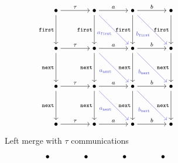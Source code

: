 \begin{figure}[!ht]
   \centering

   \begin{subfigure}[b]{0.475\textwidth}
      \[\begin{tikzcd}[cramped, column sep=scriptsize]
	 \bullet && \bullet && \bullet && \bullet \\
	 \\
	 \bullet && \bullet && \bullet && \bullet \\
	 \\
	 \bullet && \bullet && \bullet && \bullet \\
	 \\
	 \bullet && \bullet && \bullet && \bullet
	 \arrow["\tau", from=1-1, to=1-3]
	 \arrow["{\mathtt{first}}"', from=1-1, to=3-1]
	 \arrow["a", from=1-3, to=1-5]
	 \arrow["{\mathtt{first}}"', from=1-3, to=3-3]
	 \arrow["{a_\mathtt{first}}"', color={rgb,255:red,92;green,92;blue,214}, from=1-3, to=3-5]
	 \arrow["b", from=1-5, to=1-7]
	 \arrow["{\mathtt{first}}"', from=1-5, to=3-5]
	 \arrow["{b_\mathtt{first}}"', color={rgb,255:red,92;green,92;blue,214}, from=1-5, to=3-7]
	 \arrow["{\mathtt{first}}"', from=1-7, to=3-7]
	 \arrow["\tau", from=3-1, to=3-3]
	 \arrow["{\mathtt{next}}"', from=3-1, to=5-1]
	 \arrow["a", from=3-3, to=3-5]
	 \arrow["{\mathtt{next}}"', from=3-3, to=5-3]
	 \arrow["{a_\mathtt{next}}"', color={rgb,255:red,92;green,92;blue,214}, from=3-3, to=5-5]
	 \arrow["b", from=3-5, to=3-7]
	 \arrow["{\mathtt{next}}"', from=3-5, to=5-5]
	 \arrow["{b_\mathtt{next}}"', color={rgb,255:red,92;green,92;blue,214}, from=3-5, to=5-7]
	 \arrow["{\mathtt{next}}"', from=3-7, to=5-7]
	 \arrow["\tau", from=5-1, to=5-3]
	 \arrow["{\mathtt{next}}"', from=5-1, to=7-1]
	 \arrow["a", from=5-3, to=5-5]
	 \arrow["{\mathtt{next}}"', from=5-3, to=7-3]
	 \arrow["{a_\mathtt{next}}"', color={rgb,255:red,92;green,92;blue,214}, from=5-3, to=7-5]
	 \arrow["b", from=5-5, to=5-7]
	 \arrow["{\mathtt{next}}"', from=5-5, to=7-5]
	 \arrow["{b_\mathtt{next}}"', color={rgb,255:red,92;green,92;blue,214}, from=5-5, to=7-7]
	 \arrow["{\mathtt{next}}"', from=5-7, to=7-7]
	 \arrow["\tau", from=7-1, to=7-3]
	 \arrow["a", from=7-3, to=7-5]
	 \arrow["b", from=7-5, to=7-7]
      \end{tikzcd}\]
      \caption{Left merge with $\tau$ communications}
   \end{subfigure}
   \hfill
   \begin{subfigure}[b]{0.475\textwidth}
      \[\begin{tikzcd}[cramped, column sep=scriptsize]
	 \bullet && \bullet && \bullet && \bullet \\

\end{tikzcd}\]
\end{subfigure}
\end{figure}
